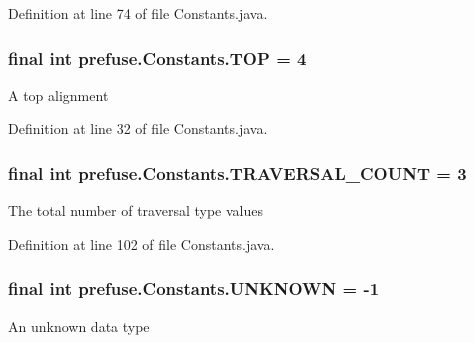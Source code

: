 \-Definition at line 74 of file \-Constants.\-java.

\hypertarget{interfaceprefuse_1_1_constants_af6426f8a0cc782239115cd90e7f167e3}{
\subsubsection[{\-T\-O\-P}]{\setlength{\rightskip}{0pt plus 5cm}final int {\bf prefuse.\-Constants.\-T\-O\-P} = 4}}\label{interfaceprefuse_1_1_constants_af6426f8a0cc782239115cd90e7f167e3}
\-A top alignment 

\-Definition at line 32 of file \-Constants.\-java.

\hypertarget{interfaceprefuse_1_1_constants_ae5a466e1c5736af1fef4f295af39273f}{
\subsubsection[{\-T\-R\-A\-V\-E\-R\-S\-A\-L\-\_\-\-C\-O\-U\-N\-T}]{\setlength{\rightskip}{0pt plus 5cm}final int {\bf prefuse.\-Constants.\-T\-R\-A\-V\-E\-R\-S\-A\-L\-\_\-\-C\-O\-U\-N\-T} = 3}}\label{interfaceprefuse_1_1_constants_ae5a466e1c5736af1fef4f295af39273f}
\-The total number of traversal type values 

\-Definition at line 102 of file \-Constants.\-java.

\hypertarget{interfaceprefuse_1_1_constants_a9fd27ed629dabf0df13c45e651716034}{
\subsubsection[{\-U\-N\-K\-N\-O\-W\-N}]{\setlength{\rightskip}{0pt plus 5cm}final int {\bf prefuse.\-Constants.\-U\-N\-K\-N\-O\-W\-N} = -\/1}}\label{interfaceprefuse_1_1_constants_a9fd27ed629dabf0df13c45e651716034}
\-An unknown data type 

